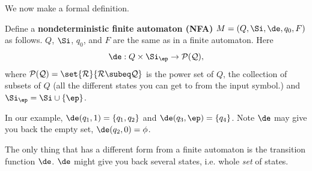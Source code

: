 We now make a formal definition.
\begin{df}
Define a \textbf{nondeterministic finite automaton (NFA)}  $M=(Q,\Si,\de,q_0,F)$ as follows. $Q$, $\Si$, $q_0$, and $F$ are the same as in a finite automaton. 
Here
\[
\de:Q\times \Si_{\ep}\to \cal P(Q),
\]
where $\cal P(Q)=\set{R}{R\subeq Q}$ is the power set of $Q$, the collection of subsets of $Q$ (all the different states you can get to from the input symbol.) and $\Si_{\ep}=\Si\cup \{\ep\}$.
\end{df}
In our example, $\de(q_1,1)=\{q_1,q_2\}$ and $\de(q_3,\ep)=\{q_4\}$. %
Note $\de$ may give you back the empty set, $\de(q_2,0)=\phi$.

The only thing that has a different form from a finite automaton is the transition function $\de$. $\de$ might give you back several states, i.e. whole {\it set} of states.


